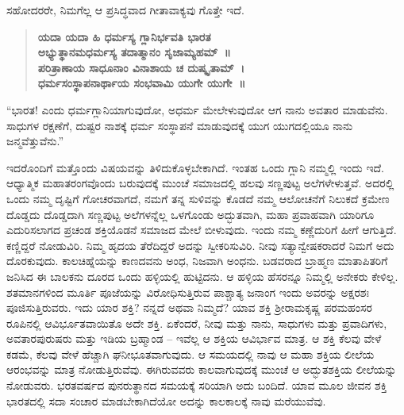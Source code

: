 ಸಹೋದರರೇ, ನಿಮಗೆಲ್ಲ ಆ ಪ್ರಸಿದ್ಧವಾದ ಗೀತಾವಾಕ್ಯವು ಗೊತ್ತೇ ಇದೆ.
\begin{verse}
\textbf{ಯದಾ ಯದಾ ಹಿ ಧರ್ಮಸ್ಯ ಗ್ಲಾನಿರ್ಭವತಿ ಭಾರತ}\\\textbf{ಅಭ್ಯುತ್ಥಾನಮಧರ್ಮಸ್ಯ ತದಾತ್ಮಾನಂ ಸೃಜಾಮ್ಯಹಮ್​~॥}\\\textbf{ಪರಿತ್ರಾಣಾಯ ಸಾಧೂನಾಂ ವಿನಾಶಾಯ ಚ ದುಷ್ಕೃತಾಮ್​~।}\\\textbf{ಧರ್ಮಸಂಸ್ಥಾಪನಾರ್ಥಾಯ ಸಂಭವಾಮಿ ಯುಗೇ ಯುಗೇ~॥}
\end{verse}

“ಭಾರತ! ಎಂದು ಧರ್ಮಗ್ಲಾನಿಯಾಗುವುದೋ, ಅಧರ್ಮ ಮೇಲೇಳುವುದೋ ಆಗ ನಾನು ಅವತಾರ ಮಾಡುವೆನು. ಸಾಧುಗಳ ರಕ್ಷಣೆಗೆ, ದುಷ್ಟರ ನಾಶಕ್ಕೆ ಧರ್ಮ ಸಂಸ್ಥಾಪನೆ ಮಾಡುವುದಕ್ಕೆ ಯುಗ ಯುಗದಲ್ಲಿಯೂ ನಾನು ಜನ್ಮವೆತ್ತುವೆನು.”

\eject

ಇದರೊಂದಿಗೆ ಮತ್ತೊಂದು ವಿಷಯವನ್ನು ತಿಳಿದುಕೊಳ್ಳಬೇಕಾಗಿದೆ. ಇಂತಹ ಒಂದು ಗ್ಲಾನಿ ನಮ್ಮಲ್ಲಿ ಇಂದು ಇದೆ. ಆಧ್ಯಾತ್ಮಿಕ ಮಹಾತರಂಗವೊಂದು ಬರುವುದಕ್ಕೆ ಮುಂಚೆ ಸಮಾಜದಲ್ಲಿ ಹಲವು ಸಣ್ಣಪುಟ್ಟ ಅಲೆಗಳೇಳುತ್ತವೆ. ಅದರಲ್ಲಿ ಒಂದು ನಮ್ಮ ದೃಷ್ಟಿಗೆ ಗೋಚರವಾಗದೆ, ನಮಗೆ ತನ್ನ ಸುಳಿವನ್ನು ಕೊಡದೆ ನಮ್ಮ ಆಲೋಚನೆಗೆ ನಿಲುಕದೆ ಕ್ರಮೇಣ ದೊಡ್ಡದು ದೊಡ್ಡದಾಗಿ ಸಣ್ಣಪುಟ್ಟ ಅಲೆಗಳನ್ನೆಲ್ಲ ಒಳಗೊಂಡು ಅದ್ಭುತವಾಗಿ, ಮಹಾ ಪ್ರವಾಹವಾಗಿ ಯಾರಿಗೂ ಎದುರಿಸಲಾಗದ ಪ್ರಚಂಡ ಶಕ್ತಿಯೊಡನೆ ಸಮಾಜದ ಮೇಲೆ ಬೀಳುವುದು. ಇಂದು ನಮ್ಮ ಕಣ್ಣೆದುರಿಗೆ ಹೀಗೆ ಆಗುತ್ತಿದೆ. ಕಣ್ಣಿದ್ದರೆ ನೋಡುವಿರಿ. ನಿಮ್ಮ ಹೃದಯ ತೆರೆದಿದ್ದರೆ ಅದನ್ನು ಸ್ವೀಕರಿಸುವಿರಿ. ನೀವು ಸತ್ಯಾನ್ವೇಷಕರಾದರೆ ನಿಮಗೆ ಅದು ದೊರಕುವುದು. ಕಾಲಚಿಹ್ನೆಯನ್ನು ಕಾಣದವನು ಅಂಧ, ನಿಜವಾಗಿ ಅಂಧನು. ಬಡವರಾದ ಬ್ರಾಹ್ಮಣ ಮಾತಾಪಿತರಿಗೆ ಜನಿಸಿದ ಈ ಬಾಲಕನು ದೂರದ ಒಂದು ಹಳ್ಳಿಯಲ್ಲಿ ಹುಟ್ಟಿದನು. ಆ ಹಳ್ಳಿಯ ಹೆಸರನ್ನೂ ನಿಮ್ಮಲ್ಲಿ ಅನೇಕರು ಕೇಳಿಲ್ಲ. ಶತಮಾನಗಳಿಂದ ಮೂರ್ತಿ ಪೂಜೆಯನ್ನು ವಿರೋಧಿಸುತ್ತಿರುವ ಪಾಶ್ಚಾತ್ಯ ಜನಾಂಗ ಇಂದು ಅವರನ್ನು ಅಕ್ಷರಶಃ ಪೂಜಿಸುತ್ತಿರುವರು. ಇದು ಯಾರ ಶಕ್ತಿ? ನನ್ನದೆ ಅಥವಾ ನಿಮ್ಮದೆ? ಯಾವ ಶಕ್ತಿ ಶ‍್ರೀರಾಮಕೃಷ್ಣ ಪರಮಹಂಸರ ರೂಪಿನಲ್ಲಿ ಆವಿರ್ಭೂತವಾಯಿತೊ ಅದೇ ಶಕ್ತಿ. ಏಕೆಂದರೆ, ನೀವು ಮತ್ತು ನಾನು, ಸಾಧುಗಳು ಮತ್ತು ಪ್ರವಾದಿಗಳು, ಅವತಾರಪುರುಷರು ಮತ್ತು ಇಡಿಯ ಬ್ರಹ್ಮಾಂಡ – ಇವೆಲ್ಲ ಆ ಶಕ್ತಿಯ ಆವಿರ್ಭಾವ ಮಾತ್ರ. ಆ ಶಕ್ತಿ ಕೆಲವು ವೇಳೆ ಕಡಮೆ, ಕೆಲವು ವೇಳೆ ಹೆಚ್ಚಾಗಿ ಘನೀಭೂತವಾಗುವುದು. ಆ ಸಮಯದಲ್ಲಿ ನಾವು ಆ ಮಹಾ ಶಕ್ತಿಯ ಲೀಲೆಯ ಆರಂಭವನ್ನು ಮಾತ್ರ ನೋಡುತ್ತಿರುವೆವು. ಈಗಿರುವವರು ಕಾಲವಾಗುವುದಕ್ಕೆ ಮುಂಚೆ ಆ ಅದ್ಭುತಶಕ್ತಿಯ ಲೀಲೆಯನ್ನು ನೋಡುವರು. ಭರತವರ್ಷದ ಪುನರುತ್ಥಾನದ ಸಮಯಕ್ಕೆ ಸರಿಯಾಗಿ ಅದು ಬಂದಿದೆ. ಯಾವ ಮೂಲ ಜೀವನ ಶಕ್ತಿ ಭಾರತದಲ್ಲಿ ಸದಾ ಸಂಚಾರ ಮಾಡಬೇಕಾಗಿದೆಯೋ ಅದನ್ನು ಕಾಲಕಾಲಕ್ಕೆ ನಾವು ಮರೆಯುವೆವು.

\vskip   4pt

